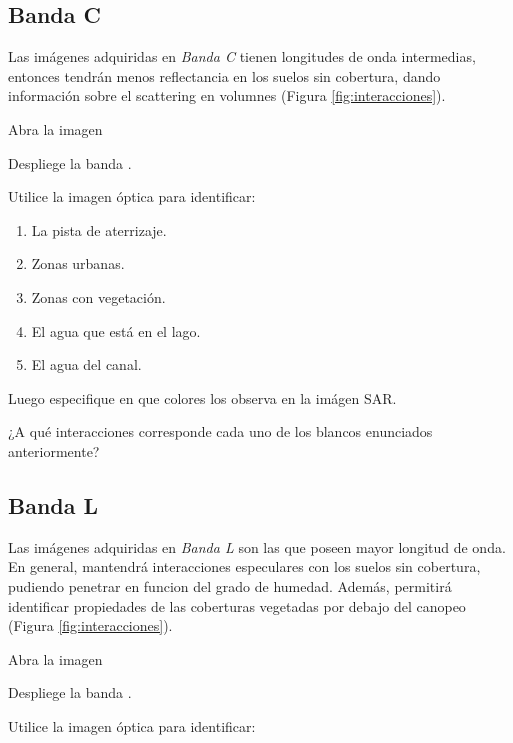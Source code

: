 \subsection{Banda C}

Las imágenes adquiridas en \emph{Banda C} tienen longitudes de onda intermedias, entonces tendrán menos reflectancia en los suelos sin cobertura, dando información sobre el scattering en volumnes (Figura \ref{fig:interacciones}).

Abra la imagen
\begin{center}
  \end{center}

Despliege la banda .

Utilice la imagen óptica para identificar:

\begin{enumerate}
    \item La pista de aterrizaje.
    \item Zonas urbanas.
    \item Zonas con vegetación.
    \item El agua que está en el lago.
    \item El agua del canal.
\end{enumerate}
Luego especifique en que colores los observa en la imágen SAR.


\begin{que}
    ¿A qué interacciones corresponde cada uno de los blancos enunciados anteriormente?
\end{que}

\subsection{Banda L}

Las imágenes adquiridas en \emph{Banda L} son las que poseen mayor longitud de onda. En general, mantendrá interacciones especulares con los suelos sin cobertura, pudiendo penetrar en funcion del grado de humedad. Además, permitirá identificar propiedades de las coberturas vegetadas por debajo del canopeo (Figura \ref{fig:interacciones}).

Abra la imagen
\begin{center}
\end{center}
Despliege la banda .


Utilice la imagen óptica para identificar:

